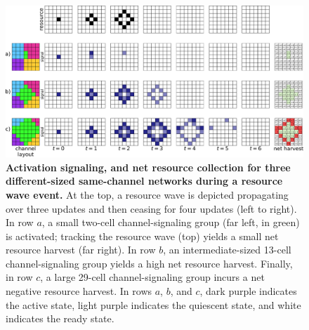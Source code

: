 \begin{figure}[t]
\begin{center}
\includegraphics[width=\columnwidth]{img/explanatory}
\caption{
\textbf{Activation signaling, and net resource collection for three different-sized same-channel networks during a resource wave event.}
At the top, a resource wave is depicted propagating over three updates and then ceasing for four updates (left to right).
In row $a$, a small two-cell channel-signaling group (far left, in green) is activated; tracking the resource wave (top) yields a small net resource harvest (far right).
In row $b$, an intermediate-sized 13-cell channel-signaling group yields a high net resource harvest.
Finally, in row $c$, a large 29-cell channel-signaling group incurs a net negative resource harvest.
In rows $a$, $b$, and $c$, dark purple indicates the active state, light purple indicates the quiescent state, and white indicates the ready state.
}
\label{fig:explanatory}
\end{center}
\end{figure}
